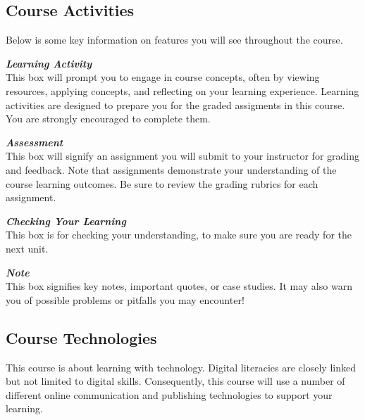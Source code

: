 \documentclass[
]{book}
\theoremstyle{definition}
\theoremstyle{definition}
\theoremstyle{definition}
\theoremstyle{definition}
\theoremstyle{remark}
\begin{document}
\hypertarget{course-activities}{%
\subsection*{Course Activities}\label{course-activities}}

Below is some key information on features you will see throughout the course.

\begin{reflect}
\textbf{\emph{Learning Activity}}\\
This box will prompt you to engage in course concepts, often by viewing
resources, applying concepts, and reflecting on your learning
experience. Learning activities are designed to prepare you for the
graded assigments in this course. You are strongly encouraged to
complete them.
\end{reflect}

\begin{assessment}
\textbf{\emph{Assessment}}\\
This box will signify an assignment you will submit to your instructor
for grading and feedback. Note that assignments demonstrate your
understanding of the course learning outcomes. Be sure to review the
grading rubrics for each assignment.
\end{assessment}

\begin{progress}
\textbf{\emph{Checking Your Learning}}\\
This box is for checking your understanding, to make sure you are ready
for the next unit.
\end{progress}

\begin{feedback}
\textbf{\emph{Note}}\\
This box signifies key notes, important quotes, or case studies. It may
also warn you of possible problems or pitfalls you may encounter!
\end{feedback}

\hypertarget{course-technologies}{%
\subsection*{Course Technologies}\label{course-technologies}}

This course is about learning with technology. Digital literacies are closely linked but not limited to digital skills. Consequently, this course will use a number of different online communication and publishing technologies to support your learning.
\end{document}

